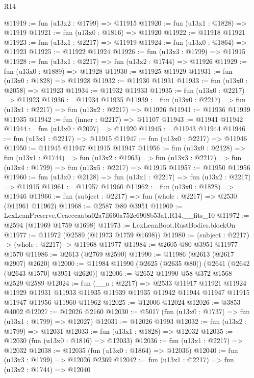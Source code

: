 \begin{lexlean}{R14}
\begin{coremodule}
@11919 := fun (u13x2 : @1799) => @11915
@11920 := fun (u13x1 : @1828) => @11919
@11921 := fun (u13x0 : @1816) => @11920
@11922 := @11918 @11921
@11923 := fun (u13x1 : @2217) => @11919
@11924 := fun (u13x0 : @1864) => @11923
@11925 := @11922 @11924
@11926 := fun (u13x3 : @1799) => @11915
@11928 := fun (u13x1 : @2217) => fun (u13x2 : @1744) => @11926
@11929 := fun (u13x0 : @1889) => @11928
@11930 := @11925 @11929
@11931 := fun (u13x0 : @1828) => @11928
@11932 := @11930 @11931
@11933 := fun (u13x0 : @2058) => @11923
@11934 := @11932 @11933
@11935 := fun (u13x0 : @2217) => @11923
@11936 := @11934 @11935
@11939 := fun (u13x0 : @2217) => fun (u13x1 : @2217) => fun (u13x2 : @2217) => @11926
@11941 := @11936 @11939 @11935
@11942 := fun (inner : @2217) => @11107
@11943 := @11941 @11942
@11944 := fun (u13x0 : @2097) => @11920
@11945 := @11943 @11944
@11946 := fun (u13x1 : @2217) => @11915
@11947 := fun (u13x0 : @2217) => @11946
@11950 := @11945 @11947 @11915 @11947
@11956 := fun (u13x0 : @2128) =>
  fun (u13x1 : @1744) =>
  fun (u13x2 : @1963) => fun (u13x3 : @2217) => fun (u13x4 : @1799) => fun (u13x5 : @2217) => @11915
@11957 := @11950 @11956
@11960 := fun (u13x0 : @2128) => fun (u13x1 : @2217) => fun (u13x2 : @2217) => @11915
@11961 := @11957 @11960
@11962 := fun (u13x0 : @1828) => @11946
@11966 := fun (subject : @2217) => fun (whole : @2217) => @2530 (@11961 @11962)
@11968 := @2587 @80 @3951
@11969 := LexLeanPreserve.Ccaeccaaba02a7ff660a752e6908b53a1.R14.__fits_10
@11972 := @2594 (@11969 @1759 @1698)
@11973 := LexLeanBoot.RustBodies.blockOn
@11977 := @11972 (@2589 (@11973 @1759 @1698))
@11980 := (subject : @2217) -> (whole : @2217) -> @11968 @11977
@11984 := @2605 @80 @3951 @11977 @1570
@11986 := @2613 (@2769 @2590)
@11990 := @11986 (@2613 (@2617 @2907) @2620)
@12000 := @11984 @11990 (@2625 (@2635 @80)) (@2641 (@2642 (@2643 @1570) @3951 @2620))
@12006 := @2652 @11990 @58 @372 @1568 @2529 @2589
@12024 := fun (__a : @2217) =>
  @2533
    @11917
    @11921
    @11924
    @11929
    @11931
    @11933
    @11935
    @11939
    @11935
    @11942
    @11944
    @11947
    @11915
    @11947
    @11956
    @11960
    @11962
@12025 := @12006 @12024
@12026 := @3853 @4002
@12027 := @12026 @2160
@12030 := @5017 (fun (u13x0 : @1737) => fun (u13x1 : @1799) => @12027)
@12031 := @12026 @1993
@12032 := fun (u13x2 : @1799) => @12031
@12033 := fun (u13x1 : @1828) => @12032
@12035 := @12030 (fun (u13x0 : @1816) => @12033)
@12036 := fun (u13x1 : @2217) => @12032
@12038 := @12035 (fun (u13x0 : @1864) => @12036)
@12040 := fun (u13x3 : @1799) => @12026 @2369
@12042 := fun (u13x1 : @2217) => fun (u13x2 : @1744) => @12040

\end{coremodule}
\end{lexlean}
